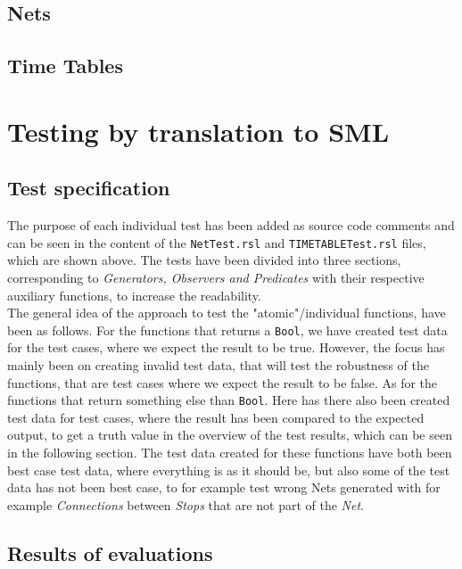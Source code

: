 \documentclass[a4]{article}
\begin{document}
\subsection{Nets}



\subsection{Time Tables}



\section{Testing by translation to SML}

\subsection{Test specification}

The purpose of each individual test has been added as source code comments and can be seen in the content of the \verb=NetTest.rsl=  and \verb=TIMETABLETest.rsl= files, which are shown above. The tests have been divided into three sections, corresponding to \emph{Generators, Observers and Predicates} with their respective auxiliary functions, to increase the readability. \\

The general idea of the approach to test the "atomic"/individual functions, have been as follows. For the functions that returns a \verb=Bool=, we have created test data for the test cases, where we expect the result to be true. However, the focus has mainly been on creating invalid test data, that will test the robustness of the functions, that are test cases where we expect the result to be false. As for the functions that return something else than \verb=Bool=. Here has there also been created test data for test cases, where the result has been compared to the expected output, to get a truth value in the overview of the test results, which can be seen in the following section. The test data created for these functions have both been best case test data, where everything is as it should be, but also some of the test data has not been best case, to for example test wrong Nets generated with for example \emph{Connections} between \emph{Stops} that are not part of the \emph{Net}.


\subsection{Results of evaluations}
\end{document}
